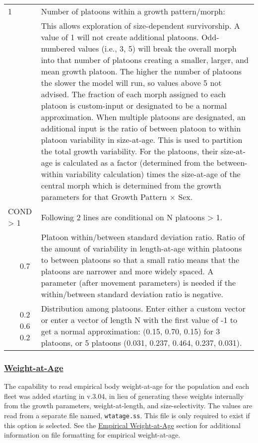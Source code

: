 \begin{center}
\begin{longtable}{p{0.5cm} p{2cm} p{12.5cm}}
		\hline
		1 & & Number of platoons within a growth pattern/morph: \Tstrut\\
		& & This allows exploration of size-dependent survivorship. A value of 1 will not create additional platoons. Odd-numbered values (i.e., 3, 5) will break the overall morph into that number of platoons creating a smaller, larger, and mean growth platoon. The higher the number of platoons the slower the model will run, so values above 5 not advised. The fraction of each morph assigned to each platoon is custom-input or designated to be a normal approximation. When multiple platoons are designated, an additional input is the ratio of between platoon to within platoon variability in size-at-age. This is used to partition the total growth variability. For the platoons, their size-at-age is calculated as a factor (determined from the between-within variability calculation) times the size-at-age of the central morph which is determined from the growth parameters for that Growth Pattern $\times$ Sex. \Bstrut\\

		\multicolumn{2}{l}{COND > 1} & \multicolumn{1}{l}{\parbox{12cm}{Following 2 lines are conditional on N platoons > 1.}} \Tstrut\Bstrut\\

		& 0.7 & Platoon within/between standard deviation ratio. Ratio of the amount of variability in length-at-age within platoons to between platoons so that a small ratio means that the platoons are narrower and more widely spaced. A parameter (after movement parameters) is needed if the within/between standard deviation ratio is negative. \Bstrut\\

		& 0.2 0.6 0.2 & Distribution among platoons. Enter either a custom vector or enter a vector of length N with the first value of -1 to get a normal approximation: (0.15, 0.70, 0.15) for 3 platoons, or 5 platoons (0.031, 0.237, 0.464, 0.237, 0.031). \Bstrut\\
		\hline
	\end{longtable}
	\vspace*{-\baselineskip}
\end{center}

\hypertarget{WatA}{}
\subsubsection[Weight-at-Age]{\protect\hyperlink{WatA}{Weight-at-Age}}
The capability to read empirical body weight-at-age for the population and each fleet was added starting in v.3.04, in lieu of generating these weights internally from the growth parameters, weight-at-length, and size-selectivity. The values are read from a separate file named, \texttt{wtatage.ss}. This file is only required to exist if this option is selected. See the \hyperlink{WAA}{Empirical Weight-at-Age} section for additional information on file formatting for empirical weight-at-age.

